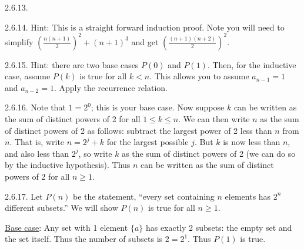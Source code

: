 \begin {itemize}
\begin{ans}{2.6.13.}
	
\end{ans}
\begin{ans}{2.6.14.}
		Hint: This is a straight forward induction proof.  Note you will need to simplify $\left(\frac{n(n+1)}{2}\right)^2 + (n+1)^3$ and get $\left(\frac{(n+1)(n+2)}{2}\right)^2$.
	
\end{ans}
\begin{ans}{2.6.15.}
		Hint: there are two base cases $P(0)$ and $P(1)$.  Then, for the inductive case, assume $P(k)$ is true for all $k < n$.  This allows you to assume $a_{n-1} = 1$ and $a_{n-2} = 1$.  Apply the recurrence relation.
	
\end{ans}
\begin{ans}{2.6.16.}
		Note that $1 = 2^0$; this is your base case.  Now suppose $k$ can be written as the sum of distinct powers of 2 for all $1\le k \le n$.  We can then write $n$ as the sum of distinct powers of 2 as follows: subtract the largest power of 2 less than $n$ from $n$.  That is, write $n = 2^j + k$ for the largest possible $j$.  But $k$ is now less than $n$, and also less than $2^j$, so write $k$ as the sum of distinct powers of 2 (we can do so by the inductive hypothesis).  Thus $n$ can be written as the sum of distinct powers of 2 for all $n \ge 1$.
	
\end{ans}
\begin{ans}{2.6.17.}
		Let $P(n)$ be the statement, ``every set containing $n$ elements has $2^n$ different subsets.''  We will show $P(n)$ is true for all $n \ge 1$.

		\underline{Base case}: Any set with 1 element $\{a\}$ has exactly 2 subsets: the empty set and the set itself.  Thus the number of subsets is $2= 2^1$.  Thus $P(1)$ is true.


\end{ans}
\end{itemize}
